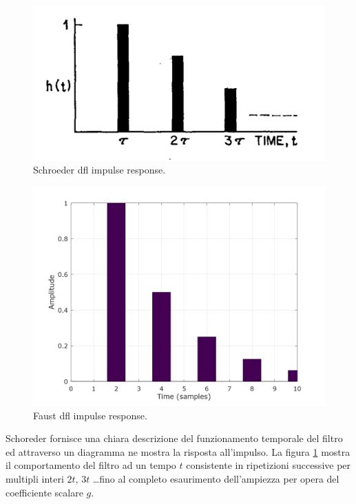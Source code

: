\begin{refsection}
\begin{figure}[ht]
  \centering
  \includegraphics[width=\textwidth]{CAPITOLI/0500/IMG/dfl-ir.png}
  \caption[]{Schroeder dfl impulse response.}
  \label{schroeder:dflir}
\end{figure}

\begin{figure}[ht]
  \centering
  \includegraphics[width=\textwidth]{CAPITOLI/0500/CODES/REV/dfl.png}
  \caption[]{Faust dfl impulse response.}
  \label{faust:dflir}
\end{figure}

Schoreder fornisce una chiara descrizione del funzionamento temporale del filtro
ed attraverso un diagramma ne mostra la risposta all'impulso. La figura
\ref{schroeder:dflir} mostra il comportamento del filtro ad un tempo $t$
consistente in ripetizioni successive per multipli interi $2t$, $3t$ \ldots fino
al completo esaurimento dell'ampiezza per opera del coefficiente scalare $g$.




\end{refsection}
